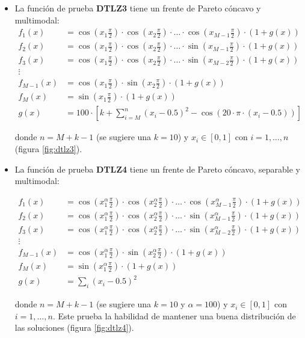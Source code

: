 \begin{itemize}
\item La funci\'on de prueba \textbf{DTLZ3} tiene un frente de Pareto c\'oncavo y multimodal:
\begin{align*}
f_1(x)&=\cos(x_1\frac{\pi}{2})\cdot\cos(x_2\frac{\pi}{2})\cdot\ldots\cdot \cos(x_{M-1}\frac{\pi}{2})\cdot(1+g(x))\\
f_2(x)&=\cos(x_1\frac{\pi}{2})\cdot\cos(x_2\frac{\pi}{2})\cdot\ldots\cdot \sin(x_{M-1}\frac{\pi}{2})\cdot(1+g(x))\\
f_3(x)&=\cos(x_1\frac{\pi}{2})\cdot\cos(x_2\frac{\pi}{2})\cdot\ldots\cdot \sin(x_{M-2}\frac{\pi}{2})\cdot(1+g(x))\\
\vdots&\\
f_{M-1}(x)&=\cos(x_1\frac{\pi}{2})\cdot\sin(x_2\frac{\pi}{2})\cdot(1+g(x))\\
f_{M}(x)&=\sin(x_1\frac{\pi}{2})\cdot (1+g(x))\\
g(x)&=100\cdot [k+\sum_{i=M}^n(x_i-0.5)^2-\cos(20\cdot\pi\cdot(x_i-0.5))]
\end{align*}

donde $n=M+k-1$ (se sugiere una $k=10$) y $x_i\in[0,1]$ con $i=1, \ldots, n$ (figura \ref{fig:dtlz3}).

\item La funci\'on de prueba \textbf{DTLZ4} tiene un frente de Pareto c\'oncavo, separable y multimodal:

\begin{align*}
f_1(x)&=\cos(x_1^\alpha\frac{\pi}{2})\cdot\cos(x_2^\alpha\frac{\pi}{2})\cdot\ldots\cdot \cos(x_{M-1}^\alpha\frac{\pi}{2})\cdot(1+g(x))\\
f_2(x)&=\cos(x_1^\alpha\frac{\pi}{2})\cdot\cos(x_2^\alpha\frac{\pi}{2})\cdot\ldots\cdot \sin(x_{M-1}^\alpha\frac{\pi}{2})\cdot(1+g(x))\\
f_3(x)&=\cos(x_1^\alpha\frac{\pi}{2})\cdot\cos(x_2^\alpha\frac{\pi}{2})\cdot\ldots\cdot \sin(x_{M-2}^\alpha\frac{\pi}{2})\cdot(1+g(x))\\
\vdots&\\
f_{M-1}(x)&=\cos(x_1^\alpha\frac{\pi}{2})\cdot\sin(x_2^\alpha\frac{\pi}{2})\cdot(1+g(x))\\
f_{M}(x)&=\sin(x_1^\alpha\frac{\pi}{2})\cdot(1+g(x))\\
g(x)&=\sum_i(x_i-0.5)^2
\end{align*}

donde $n=M+k-1$ (se sugiere una $k=10$ y $\alpha=100$) y $x_i\in[0,1]$ con $i=1,\ldots, n$. Este \DIFdelbegin {}\DIFdelend \DIFaddbegin {}\DIFaddend prueba la habilidad de mantener 
una buena distribuci\'on de las soluciones (figura \ref{fig:dtlz4}).


\end{itemize}
